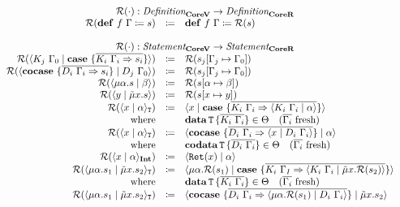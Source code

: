 \[
  \begin{array}{rcll}
    \multicolumn{4}{c}{\redundancy{\cdot} : \emph{Definition}_{\targetvar{}} \rightarrow \emph{Definition}_{\targetred{}}}\\
    \redundancy{\defi{f\ \Gamma}{s}} & \coloneq & \defi{f\ \Gamma}{\redundancy{s}} & \\
    \\
    \multicolumn{4}{c}{\redundancy{\cdot} : \emph{Statement}_{\targetvar{}} \rightarrow \emph{Statement}_{\targetred{}}}\\
    \redundancy{\cut{K_j\ \Gamma_0}{\case{\overline{K_i\ \Gamma_i \Rightarrow s_i}}}} & \coloneq & \redundancy{s_j[\Gamma_j \mapsto \Gamma_0]} & \\
    \redundancy{\cut{\cocase{\overline{D_i\ \Gamma_i \Rightarrow s_i}}}{D_j\ \Gamma_0}} & \coloneq & \redundancy{s_j[\Gamma_j \mapsto \Gamma_0]} & \\
    \redundancy{\cut{\mu\alpha.s}{\beta}} & \coloneq & \redundancy{s[\alpha \mapsto \beta]} & \\
    \redundancy{\cut{y}{\tilde{\mu}x.s}} & \coloneq & \redundancy{s[x \mapsto y]} & \\
    \redundancy{\cut{x}{\alpha}_\mathtt{T}} & \coloneq & \cut{x}{\case{\overline{K_i\ \Gamma_i \Rightarrow \cut{K_i\ \Gamma_i}{\alpha}}}} & \\
    \text{where} &  & \data{T}{\overline{K_i\ \Gamma_i}} \in \Theta \quad \fresh{\overline{\Gamma_i}} & \\
    \redundancy{\cut{x}{\alpha}_\mathtt{T}} & \coloneq & \cut{\cocase{\overline{D_i\ \Gamma_i \Rightarrow \cut{x}{D_i\ \Gamma_i}}}}{\alpha} & \\
    \text{where} &  & \codata{T}{\overline{D_i\ \Gamma_i}} \in \Theta \quad \fresh{\overline{\Gamma_i}} & \\
    \redundancy{\cut{x}{\alpha}_\tyint} & \coloneq & \cut{\mathtt{Ret}(x)}{\alpha} & \\
    \redundancy{\cut{\mu\alpha.s_1}{\tilde{\mu}x.s_2}_\mathtt{T}} & \coloneq & \cut{\mu\alpha.\redundancy{s_1}}{\case{\overline{K_i\ \Gamma_I \Rightarrow \cut{K_i\ \Gamma_i}{\tilde{\mu}x.\redundancy{s_2}}}}} & \\
    \text{where} &  & \data{T}{\overline{K_i\ \Gamma_i}} \in \Theta \quad \fresh{\overline{\Gamma_i}} & \\
    \redundancy{\cut{\mu\alpha.s_1}{\tilde{\mu}x.s_2}_\mathtt{T}} & \coloneq & \cut{\cocase{\overline{D_i\ \Gamma_i \Rightarrow \cut{\mu\alpha.\redundancy{s_1}}{D_i\ \Gamma_i}}}}{\tilde{\mu}x.s_2} & \\

\end{array}\]
